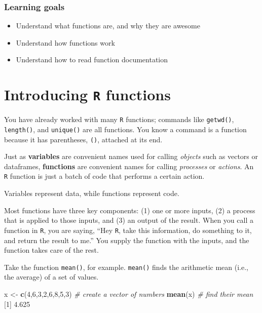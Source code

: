 \documentclass[
]{book}
\newenvironment{Shaded}{\begin{snugshade}}{\end{snugshade}}
\newcommand{\CommentTok}[1]{\textcolor[rgb]{0.56,0.35,0.01}{\textit{#1}}}
\newcommand{\DecValTok}[1]{\textcolor[rgb]{0.00,0.00,0.81}{#1}}
\newcommand{\FloatTok}[1]{\textcolor[rgb]{0.00,0.00,0.81}{#1}}
\newcommand{\KeywordTok}[1]{\textcolor[rgb]{0.13,0.29,0.53}{\textbf{#1}}}
\newcommand{\NormalTok}[1]{#1}
\newcommand{\StringTok}[1]{\textcolor[rgb]{0.31,0.60,0.02}{#1}}
\providecommand{\tightlist}{%
  \setlength{\itemsep}{0pt}\setlength{\parskip}{0pt}}
\begin{document}
\hypertarget{learning-goals-4}{%
\subsubsection*{Learning goals}\label{learning-goals-4}}

\begin{itemize}
\tightlist
\item
  Understand what functions are, and why they are awesome
\item
  Understand how functions work
\item
  Understand how to read function documentation
\end{itemize}

\hypertarget{introducing-r-functions}{%
\section*{\texorpdfstring{Introducing \texttt{R} functions}{Introducing R functions}}\label{introducing-r-functions}}

You have already worked with many \texttt{R} functions; commands like \texttt{getwd()}, \texttt{length()}, and \texttt{unique()} are all functions. You know a command is a function because it has parentheses, \texttt{()}, attached at its end.

Just as \textbf{variables} are convenient names used for calling \emph{objects} such as vectors or dataframes, \textbf{functions} are convenient names for calling \emph{processes} or \emph{actions}. An \texttt{R} function is just a batch of code that performs a certain action.

Variables represent data, while functions represent code.

Most functions have three key components: (1) one or more inputs, (2) a process that is applied to those inputs, and (3) an output of the result. When you call a function in \texttt{R}, you are saying, ``Hey \texttt{R}, take this information, do something to it, and return the result to me.'' You supply the function with the inputs, and the function takes care of the rest.

Take the function \texttt{mean()}, for example. \texttt{mean()} finds the arithmetic mean (i.e., the average) of a set of values.

\begin{Shaded}
\begin{Highlighting}[]
\NormalTok{x <-}\StringTok{ }\KeywordTok{c}\NormalTok{(}\DecValTok{4}\NormalTok{,}\DecValTok{6}\NormalTok{,}\DecValTok{3}\NormalTok{,}\DecValTok{2}\NormalTok{,}\DecValTok{6}\NormalTok{,}\DecValTok{8}\NormalTok{,}\DecValTok{5}\NormalTok{,}\DecValTok{3}\NormalTok{) }\CommentTok{# create a vector of numbers}
\KeywordTok{mean}\NormalTok{(x) }\CommentTok{# find their mean}
\NormalTok{[}\DecValTok{1}\NormalTok{] }\FloatTok{4.625}
\end{Highlighting}
\end{Shaded}
\end{document}
